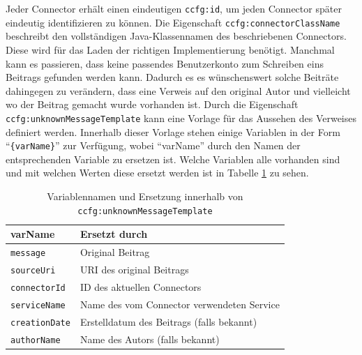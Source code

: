 Jeder Connector erhält einen eindeutigen \texttt{ccfg:id}, um jeden Connector später eindeutig identifizieren zu können. Die Eigenschaft \texttt{ccfg:connectorClassName} beschreibt den vollständigen Java-Klassennamen des beschriebenen Connectors. Diese wird für das Laden der richtigen Implementierung benötigt. Manchmal kann es passieren, dass keine passendes Benutzerkonto zum Schreiben eins Beitrags gefunden werden kann. Dadurch es es wünschenswert solche Beiträte dahingegen zu verändern, dass eine Verweis auf den original Autor und vielleicht wo der Beitrag gemacht wurde vorhanden ist. Durch die Eigenschaft \texttt{ccfg:unknownMessageTemplate} kann eine Vorlage für das Aussehen des Verweises definiert werden. Innerhalb dieser Vorlage stehen einige Variablen in der Form \enquote{\texttt{\{varName\}}} zur Verfügung, wobei \enquote{varName} durch den Namen der entsprechenden Variable zu ersetzen ist. Welche Variablen alle vorhanden sind und mit welchen Werten diese ersetzt werden ist in Tabelle \ref{tbl:unknown_message_template_vars} zu sehen. 

\begin{table}[ht]
    \caption{Variablennamen und Ersetzung innerhalb von \texttt{ccfg:unknownMessageTemplate} }
    \centering
    \begin{tabular}{l|l}
        \textbf{varName} & \textbf{Ersetzt durch} \\
        \hline
        \texttt{message} & Original Beitrag \\
        \texttt{sourceUri} & URI des original Beitrags \\
        \texttt{connectorId}  & ID des aktuellen Connectors \\
        \texttt{serviceName}  & Name des vom Connector verwendeten Service \\
        \texttt{creationDate} & Erstelldatum des Beitrags (falls bekannt) \\
        \texttt{authorName}   & Name des Autors (falls bekannt)          
    \end{tabular}
    \label{tbl:unknown_message_template_vars}
\end{table}

